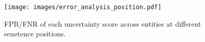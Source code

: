 \begin{figure}[t]
    \centering
    \texttt{[image: images/error\_analysis\_position.pdf]}
    \caption{
    FPR/FNR of each uncertainty score across entities at different senetence positions.
    }
    \label{fig:error_analysis_position}
\end{figure}